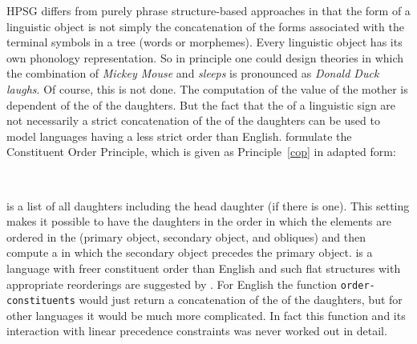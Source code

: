 \documentclass[output=paper
                ,modfonts
                ,nonflat
	        ,collection
	        ,collectionchapter
	        ,collectiontoclongg
 	        ,biblatex
                ,babelshorthands
                ,newtxmath
                ,draftmode
                ,colorlinks, citecolor=brown
]{./langsci/langscibook}
\begin{document}
HPSG differs from purely phrase structure-based approaches in that the form of a linguistic object
is not simply the concatenation of the forms associated with the terminal symbols in a tree (words or
morphemes). Every linguistic object has its own phonology representation. So in principle one could
design theories in which the combination of \emph{Mickey Mouse} and \emph{sleeps} is pronounced as
\emph{Donald Duck laughs}. Of course, this is not done. The computation of the \phon value of the
mother is dependent of the \phonvs of the daughters. But the fact that the \phonvs of a linguistic
sign are not necessarily a strict concatenation of the \phonvs of the daughters can be used to model
languages having a less strict order than English. \citet[]{ps} formulate the Constituent
Order Principle, which is given as Principle~\ref{cop} in adapted form:
\begin{principle-break}
\label{cop}
~\\[-3mm]
 \impl 
{}
\end{principle-break}
\dtrs is a list of all daughters including the head daughter (if there is one). This setting makes
it possible to have the daughters in the order in which the elements are ordered in the \compsl
(primary object, secondary object, and obliques) and then compute a \phonv in which the secondary
object precedes the primary object.  is a language with freer constituent order than
English and such flat structures with appropriate reorderings are suggested by \citet{AG2000a}. For
English the function \texttt{order-constituents} would just return a concatenation of the \phonvs of the
daughters, but for other languages it would be much more complicated. In fact this function and its
interaction with linear precedence constraints was never worked out in detail.
\end{document}

